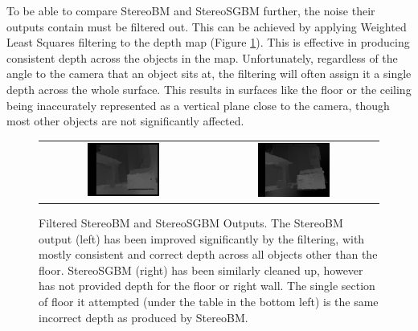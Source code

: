To be able to compare StereoBM and StereoSGBM further, the noise their outputs contain must be filtered out. This can be achieved by applying Weighted Least Squares filtering to the depth map (Figure \ref{fig:filtered}). This is effective in producing consistent depth across the objects in the map. Unfortunately, regardless of the angle to the camera that an object sits at, the filtering will often assign it a single depth across the whole surface. This results in surfaces like the floor or the ceiling being inaccurately represented as a vertical plane close to the camera, though most other objects are not significantly affected.


\begin{figure}[H]
    \begin{center}
      \begin{tabular}{ c c }
        \includegraphics[width=0.45\textwidth]{Figures/BMfiltered.jpg} &
        \includegraphics[width=0.45\textwidth]{Figures/sgbmfilt.jpg}
      \end{tabular}
      \caption[Filtered StereoBM and StereoSGBM Outputs]{Filtered StereoBM and StereoSGBM Outputs. The StereoBM output (left) has been improved significantly by the filtering, with mostly consistent and correct depth across all objects other than the floor. StereoSGBM (right) has been similarly cleaned up, however has not provided depth for the floor or right wall. The single section of floor it attempted (under the table in the bottom left) is the same incorrect depth as produced by StereoBM.}
      \label{fig:filtered}
    \end{center}
\end{figure}

